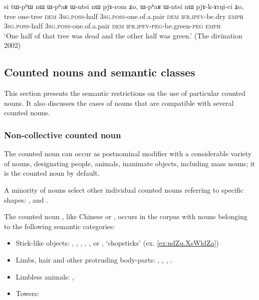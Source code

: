 \begin{exe}
	\ex \label{ex:tWphW.nW}
	\gll si tɯ-pʰɯ nɯ ɯ-pʰaʁ ɯ-ntsi nɯ pjɤ-rom ʑo, ɯ-pʰaʁ ɯ-ntsi nɯ pjɤ-k-ɤrŋi-ci ʑo, \\
	tree one-tree \textsc{dem} \textsc{3sg}.\textsc{poss}-half \textsc{3sg}.\textsc{poss}-one.of.a.pair \textsc{dem} \textsc{ifr}.\textsc{ipfv}-be.dry \textsc{emph} \textsc{3sg}.\textsc{poss}-half \textsc{3sg}.\textsc{poss}-one.of.a.pair \textsc{dem} \textsc{ifr}.\textsc{ipfv}-\textsc{peg}-be.green-\textsc{peg} \textsc{emph} \\
	\glt `One half of that tree was dead and the other half was green.' (The divination 2002)
\end{exe}


\subsection{Counted nouns and semantic classes} \label{sec:CN.classification}
 
This section presents the semantic restrictions on the use of particular counted nouns. It also discusses the cases of nouns that are compatible with several counted nouns.

\subsubsection{Non-collective counted noun}
The counted noun  can occur as postnominal modifier with a considerable variety of nouns, designating people, animals, inanimate objects, including mass nouns; it is the counted noun by default.

A minority of nouns select other individual counted nouns referring to specific shapes: ,  and .

 
The counted noun , like Chinese  or , occurs in the corpus with nouns belonging to the following semantic categories:

\begin{itemize}
\item Stick-like objects:  , , , ,  ,  or , `chopsticks' (ex. \ref{ex:ndZu.XsWldZa})
\item Limbs, hair and other protruding body-parts: , ,  , .
\item Limbless animals:  ,  
\item Towers: 
\end{itemize} 

